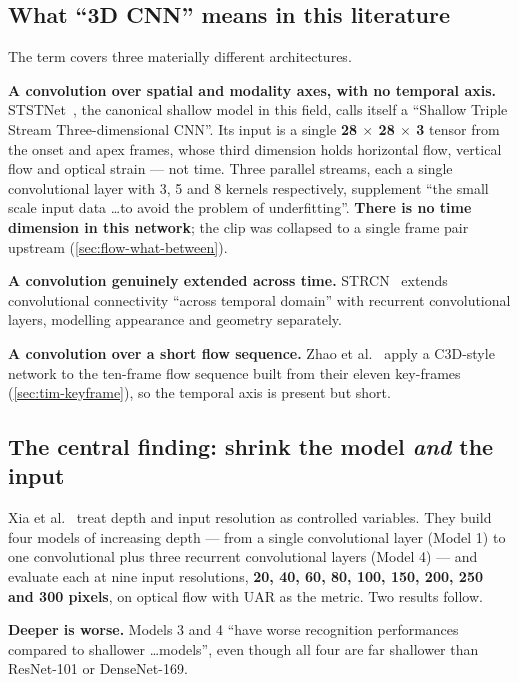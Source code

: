 \subsection{What ``3D CNN'' means in this literature}
\label{sec:cnn-meaning}

The term covers three materially different architectures.

\textbf{A convolution over spatial and modality axes, with no temporal axis.} STSTNet~\cite{liong2019b}, the canonical shallow model in this field, calls itself a ``Shallow Triple Stream Three-dimensional CNN''. Its input is a single \textbf{28 $\times$ 28 $\times$ 3} tensor from the onset and apex frames, whose third dimension holds horizontal flow, vertical flow and optical strain --- not time. Three parallel streams, each a single convolutional layer with 3, 5 and 8 kernels respectively, supplement ``the small scale input data \ldots to avoid the problem of underfitting''. \textbf{There is no time dimension in this network}; the clip was collapsed to a single frame pair upstream (\autoref{sec:flow-what-between}).

\textbf{A convolution genuinely extended across time.} STRCN~\cite{xia2020a} extends convolutional connectivity ``across temporal domain'' with recurrent convolutional layers, modelling appearance and geometry separately.

\textbf{A convolution over a short flow sequence.} Zhao et al.~\cite{zhaoS2021} apply a C3D-style network to the ten-frame flow sequence built from their eleven key-frames (\autoref{sec:tim-keyframe}), so the temporal axis is present but short.

\subsection{The central finding: shrink the model \textit{and} the input}
\label{sec:cnn-shrink}

Xia et al.~\cite{xia2020b} treat depth and input resolution as controlled variables. They build four models of increasing depth --- from a single convolutional layer (Model 1) to one convolutional plus three recurrent convolutional layers (Model 4) --- and evaluate each at nine input resolutions, \textbf{20, 40, 60, 80, 100, 150, 200, 250 and 300 pixels}, on optical flow with UAR as the metric. Two results follow.

\textbf{Deeper is worse.} Models 3 and 4 ``have worse recognition performances compared to shallower \ldots models'', even though all four are far shallower than ResNet-101 or DenseNet-169.

